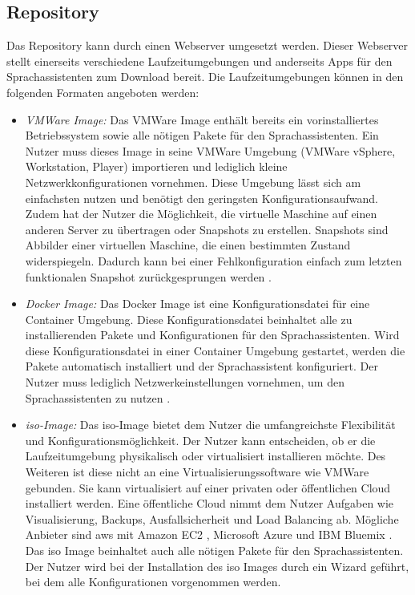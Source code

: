 \subsection{Repository}
Das Repository kann durch einen Webserver umgesetzt werden. Dieser Webserver stellt einerseits verschiedene Laufzeitumgebungen und anderseits Apps für den Sprachassistenten zum Download bereit. Die Laufzeitumgebungen können in den folgenden Formaten angeboten werden:
\begin{itemize}
	\item \textsl{VMWare Image:} Das VMWare Image enthält bereits ein vorinstalliertes Betriebssystem sowie alle nötigen Pakete für den Sprachassistenten. Ein Nutzer muss dieses Image in seine VMWare Umgebung (VMWare vSphere, Workstation, Player) importieren und lediglich kleine Netzwerkkonfigurationen vornehmen. Diese Umgebung lässt sich am einfachsten nutzen und benötigt den geringsten Konfigurationsaufwand. Zudem hat der Nutzer die Möglichkeit, die virtuelle Maschine auf einen anderen Server zu übertragen oder Snapshots zu erstellen. Snapshots sind Abbilder einer virtuellen Maschine, die einen bestimmten Zustand widerspiegeln. Dadurch kann bei einer Fehlkonfiguration einfach zum letzten funktionalen Snapshot zurückgesprungen werden \cite{VMWare}.
	\item \textsl{Docker Image:} Das Docker Image ist eine Konfigurationsdatei für eine Container Umgebung. Diese Konfigurationsdatei beinhaltet alle zu installierenden Pakete und Konfigurationen für den Sprachassistenten. Wird diese Konfigurationsdatei in einer Container Umgebung gestartet, werden die Pakete automatisch installiert und der Sprachassistent konfiguriert. Der Nutzer muss lediglich Netzwerkeinstellungen vornehmen, um den Sprachassistenten zu nutzen \cite{Docker}.
	\item \textsl{\acs{iso}-Image:} Das \acs{iso}-Image bietet dem Nutzer die umfangreichste Flexibilität und Konfigurationsmöglichkeit. Der Nutzer kann entscheiden, ob er die Laufzeitumgebung physikalisch oder virtualisiert installieren möchte. Des Weiteren ist diese nicht an eine Virtualisierungssoftware wie VMWare gebunden. Sie kann virtualisiert auf einer privaten oder öffentlichen Cloud installiert werden. Eine öffentliche Cloud nimmt dem Nutzer Aufgaben wie Visualisierung, Backups, Ausfallsicherheit und Load Balancing ab. Mögliche Anbieter sind \ac{aws} mit Amazon EC2 \cite{AWSAmazonEC2}, Microsoft Azure \cite{MicrosoftAzure} und IBM Bluemix \cite{IBMBluemix}. Das \acs{iso} Image beinhaltet auch alle nötigen Pakete für den Sprachassistenten. Der Nutzer wird bei der Installation des \acs{iso} Images durch ein Wizard geführt, bei dem alle Konfigurationen vorgenommen werden.
\end{itemize}

